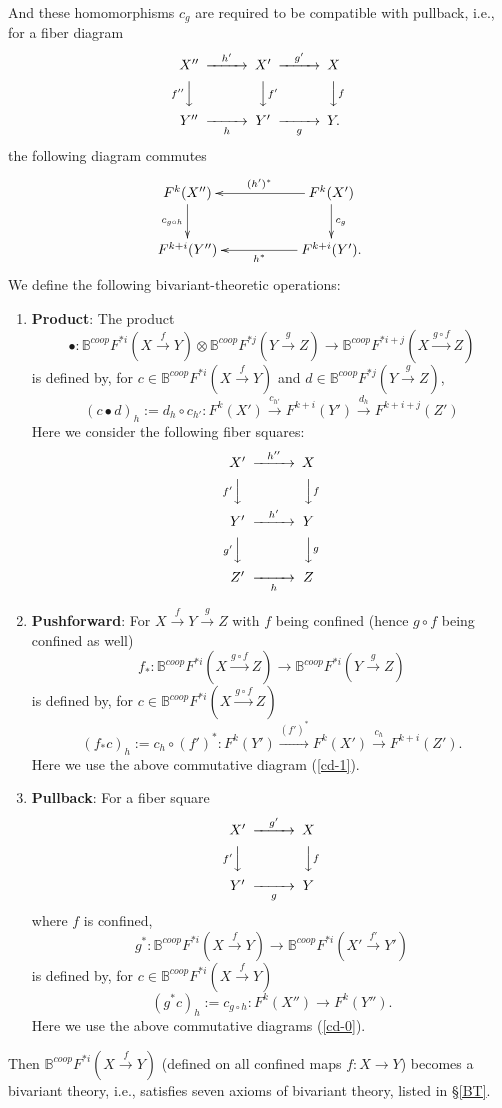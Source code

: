 \documentclass[a4paper]{amsart}
\begin{document}
\begin{thm}
And these homomorphisms $c_g$ are
required to be compatible with pullback, i.e., for a fiber diagram
\begin{equation}\label{cd-0}
\CD
X'' @> {h'}  >> X' @> {g'}  >> X\\
@V {f''} VV @VV f'V @VV fV\\
Y'' @>> {h} > Y' @>> {g} > Y.\\
\endCD
\end{equation}
the following diagram commutes
\begin{equation}\label{cd-01}
\xymatrix
{F^k(X'') \ar[d]_{c_{g \circ h}} && F^k(X')\ar[ll]_{(h')^*} \ar[d]^{c_g}\\
F^{k+i}(Y'') && F^{k+i}(Y') \ar[ll]^{h^*}.
}
\end{equation}
We define the following bivariant-theoretic operations:
\begin{enumerate}
\item {\bf Product}: The product
$$\bullet: \mathbb B^{coop}F^{*i}(X \xrightarrow f Y) \otimes \mathbb B^{coop}F^{*j}(Y \xrightarrow g Z) \to \mathbb B^{coop}F^{*i+j}(X \xrightarrow {g \circ f} Z)$$
is defined by, for $c \in \mathbb B^{coop}F^{*i}(X \xrightarrow f Y) $ and $d \in \mathbb B^{coop}F^{*j}(Y \xrightarrow g Z) $,
$$(c \bullet d)_h:= d_h \circ c_{h'}: F^k(X') \xrightarrow {c_{h'}}  F^{k+i}(Y') \xrightarrow {d_h} F^{k+i+j}(Z')$$
Here we consider the following fiber squares:
\begin{equation}\label{cd-1}
\CD
X' @> {h''} >> X \\
@V {f'}VV @VV {f}V\\
Y' @> {h'} >> Y \\
@V {g'}VV @VV {g}V \\
Z'  @>> {h} > Z \endCD 
\end{equation}
\item {\bf Pushforward}: For $X \xrightarrow f Y \xrightarrow g Z$ with $f$ being confined (hence $g \circ f$ being confined as well)
$$f_*: \mathbb B^{coop}F^{*i}(X \xrightarrow {g \circ f} Z) \to \mathbb B^{coop}F^{* i}(Y \xrightarrow g Z)$$
is defined by, for $c \in \mathbb B^{coop}F^{*i}(X \xrightarrow {g \circ f} Z)$ 
$$(f_*c)_h := c_h \circ (f')^*: F^k(Y') \xrightarrow{(f')^*} F^k(X')  \xrightarrow{c_h} F^{k+i}(Z').$$
Here we use the above commutative diagram (\ref{cd-1}).
\item {\bf Pullback}: For a fiber square 
$$\CD
X' @> {g'}  >> X\\
@V {f'} VV @VV fV\\
Y' @>> {g} > Y\\
\endCD
$$
where $f$ is confined,
$$g^*: \mathbb B^{coop}F^{* i}(X \xrightarrow f Y ) \to \mathbb B^{coop}F^{* i}(X' \xrightarrow {f'} Y' )$$
is defined by, for $c \in \mathbb B^{coop}F^{*i}(X \xrightarrow f Y) $
$$(g^*c)_h := c_{g \circ h}: F^k(X'') \to F^k(Y'').$$
Here we use the above commutative diagrams (\ref{cd-0}).
\end{enumerate} 
Then $\mathbb B^{coop}F^{* i}(X \xrightarrow f Y)$ (defined on all confined maps $f: X \to Y$) becomes a bivariant theory, i.e., satisfies seven axioms of bivariant theory, listed in \S \ref{BT}.
\end{thm}
\end{document}
